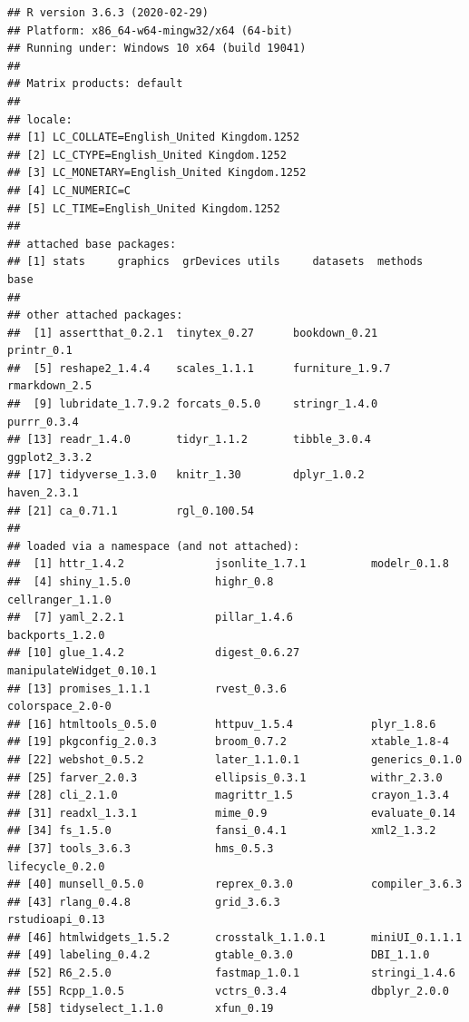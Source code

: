 \documentclass[
  finnish,
]{book}
\begin{document}
\begin{verbatim}
## R version 3.6.3 (2020-02-29)
## Platform: x86_64-w64-mingw32/x64 (64-bit)
## Running under: Windows 10 x64 (build 19041)
## 
## Matrix products: default
## 
## locale:
## [1] LC_COLLATE=English_United Kingdom.1252 
## [2] LC_CTYPE=English_United Kingdom.1252   
## [3] LC_MONETARY=English_United Kingdom.1252
## [4] LC_NUMERIC=C                           
## [5] LC_TIME=English_United Kingdom.1252    
## 
## attached base packages:
## [1] stats     graphics  grDevices utils     datasets  methods   base     
## 
## other attached packages:
##  [1] assertthat_0.2.1  tinytex_0.27      bookdown_0.21     printr_0.1       
##  [5] reshape2_1.4.4    scales_1.1.1      furniture_1.9.7   rmarkdown_2.5    
##  [9] lubridate_1.7.9.2 forcats_0.5.0     stringr_1.4.0     purrr_0.3.4      
## [13] readr_1.4.0       tidyr_1.1.2       tibble_3.0.4      ggplot2_3.3.2    
## [17] tidyverse_1.3.0   knitr_1.30        dplyr_1.0.2       haven_2.3.1      
## [21] ca_0.71.1         rgl_0.100.54     
## 
## loaded via a namespace (and not attached):
##  [1] httr_1.4.2              jsonlite_1.7.1          modelr_0.1.8           
##  [4] shiny_1.5.0             highr_0.8               cellranger_1.1.0       
##  [7] yaml_2.2.1              pillar_1.4.6            backports_1.2.0        
## [10] glue_1.4.2              digest_0.6.27           manipulateWidget_0.10.1
## [13] promises_1.1.1          rvest_0.3.6             colorspace_2.0-0       
## [16] htmltools_0.5.0         httpuv_1.5.4            plyr_1.8.6             
## [19] pkgconfig_2.0.3         broom_0.7.2             xtable_1.8-4           
## [22] webshot_0.5.2           later_1.1.0.1           generics_0.1.0         
## [25] farver_2.0.3            ellipsis_0.3.1          withr_2.3.0            
## [28] cli_2.1.0               magrittr_1.5            crayon_1.3.4           
## [31] readxl_1.3.1            mime_0.9                evaluate_0.14          
## [34] fs_1.5.0                fansi_0.4.1             xml2_1.3.2             
## [37] tools_3.6.3             hms_0.5.3               lifecycle_0.2.0        
## [40] munsell_0.5.0           reprex_0.3.0            compiler_3.6.3         
## [43] rlang_0.4.8             grid_3.6.3              rstudioapi_0.13        
## [46] htmlwidgets_1.5.2       crosstalk_1.1.0.1       miniUI_0.1.1.1         
## [49] labeling_0.4.2          gtable_0.3.0            DBI_1.1.0              
## [52] R6_2.5.0                fastmap_1.0.1           stringi_1.4.6          
## [55] Rcpp_1.0.5              vctrs_0.3.4             dbplyr_2.0.0           
## [58] tidyselect_1.1.0        xfun_0.19
\end{verbatim}
\end{document}
